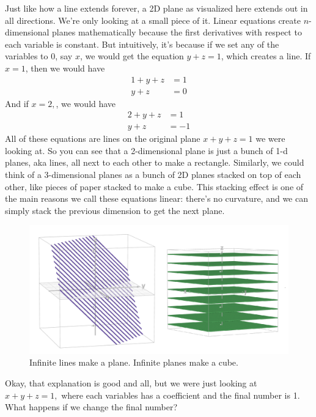 \documentclass[12pt]{scrartcl}
\begin{document}
Just like how a line extends forever, a 2D plane as visualized here extends out in all directions. We're only looking at a small piece of it. Linear equations create $n$-dimensional planes mathematically because the first derivatives with respect to each variable is constant. But intuitively, it's because if we set any of the variables to 0, say $x$, we would get the equation $y+z = 1$, which creates a line. If $x=1$, then we would have
\begin{align*}
    1 + y + z &= 1 \\
        y + z &= 0
\end{align*}
And if $x=2,$, we would have
\begin{align*}
    2 + y + z &= 1 \\
        y + z &= -1
\end{align*}
All of these equations are lines on the original plane $x+y+z=1$ we were looking at. So you can see that a 2-dimensional plane is just a bunch of 1-d planes, aka lines, all next to each other to make a rectangle. Similarly, we could think of a 3-dimensional planes as a bunch of 2D planes stacked on top of each other, like pieces of paper stacked to make a cube. This stacking effect is one of the main reasons we call these equations linear: there's no curvature, and we can simply stack the previous dimension to get the next plane.

\begin{figure}[H]
    \centering
    \includegraphics[scale=0.4]{Planes Make the Next Dimension.png}
    \caption*{Infinite lines make a plane. Infinite planes make a cube.}
\end{figure}

Okay, that explanation is good and all, but we were just looking at $x + y + z = 1,$ where each variables has a coefficient and the final number is 1. What happens if we change the final number?
\end{document}
